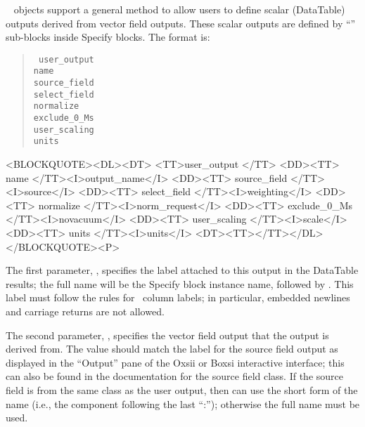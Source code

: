%
\label{par:userScalarOutputs}
\OOMMF\  objects support a general method to allow users to
define scalar (DataTable) outputs derived from vector field outputs.
These scalar outputs are defined by ``'' sub-blocks inside
Specify blocks.  The format is:
      \begin{latexonly}
      \begin{quote}\tt
      user\_output \ocb\\
       \bi name \\
       \bi source\_field \\
       \bi select\_field \\
       \bi normalize \\
       \bi exclude\_0\_Ms \\
       \bi user\_scaling \\
       \bi units \\
      \ccb
      \end{quote}
      \end{latexonly}
      \begin{rawhtml}<BLOCKQUOTE><DL><DT>
      <TT>user_output {</TT>
      <DD><TT> name </TT><I>output_name</I>
      <DD><TT> source_field </TT><I>source</I>
      <DD><TT> select_field </TT><I>weighting</I>
      <DD><TT> normalize </TT><I>norm_request</I>
      <DD><TT> exclude_0_Ms </TT><I>novacuum</I>
      <DD><TT> user_scaling </TT><I>scale</I>
      <DD><TT> units </TT><I>units</I>
      <DT><TT>}</TT></DL></BLOCKQUOTE><P>
      \end{rawhtml}
The first parameter, , specifies the label attached to
this output in the DataTable results; the full name will be the Specify
block instance name, followed by .  This label
must follow the rules for \ODT\ column labels; in particular, embedded
newlines and carriage returns are not allowed.

The second parameter, , specifies the vector
field output that the output is derived from.  The  value
should match the label for the source field output as displayed in the
``Output'' pane of the Oxsii or Boxsi interactive interface; this can
also be found in the documentation for the source field 
class.  If the source field is from the same class as the user output,
then  can use the short form of the name (i.e., the
component following the last ``:''); otherwise the full name must be
used.

